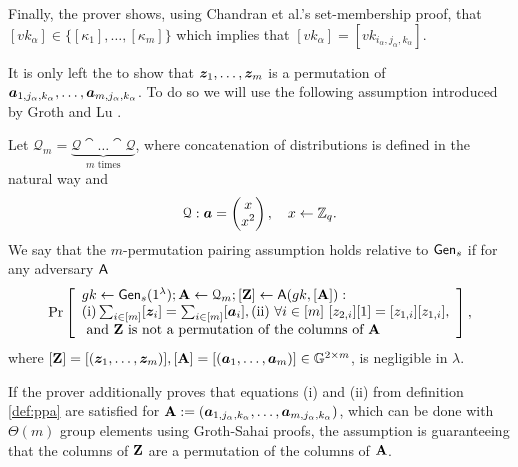 Finally, the prover  shows, using Chandran et al.'s set-membership proof, that $[vk_\alpha]\in\{[\kappa_1],\ldots,[\kappa_m]\}$ which implies that  $[vk_\alpha]=[vk_{i_\alpha,j_\alpha,k_\alpha}]$.

It is only left the to show that ${\boldsymbol{z}}_1,\ldots,{\boldsymbol{z}}_m$ is a permutation of ${\boldsymbol{a}}_{1,j_\alpha,k_\alpha},\ldots,\allowbreak{\boldsymbol{a}}_{m,j_\alpha,k_\alpha}$. To do so we will use the following assumption introduced by Groth and Lu \cite{AC:GroLu07}.
\begin{definition}\label{def:ppa}
Let $\mathcal{Q}_{m}=\underbrace{\mathcal{Q}\cat\ldots\cat\mathcal{Q}}_{m\text{ times}}$, where concatenation of  distributions is defined in the natural way and 
$$\mathcal{Q}: {\boldsymbol{a}}=\left(\begin{matrix}x\\x^2\end{matrix}\right),\quad x\gets\mathbb{Z}_q.$$
We say that the $m$-permutation pairing assumption holds relative to $\mathsf{Gen}_s$ if for any adversary $\mathsf{A}$
$$
\Pr\left[
\begin{array}{l}
gk\gets\mathsf{Gen}_s(1^\lambda);\mathbf{{A}}\gets\mathcal{Q}_{m};[\mathbf{{Z}}]\gets\mathsf{A}(gk,[\mathbf{{A}}]):\\
\mathrm{(i)} \sum_{i\in[m]}[{\boldsymbol{z}}_i]=\sum_{i\in[m]}[{\boldsymbol{a}}_i], \mathrm{(ii)}\ \forall i\in[m]\ [z_{2,i}][1]=[z_{1,i}][z_{1,i}],\\
\text{ and }\mathbf{{Z}}\text{ is not a permutation of the columns of }\mathbf{{A}}
\end{array}
\right],
$$
where $[\mathbf{{Z}}]=[({\boldsymbol{z}}_1,\ldots,{\boldsymbol{z}}_m)], [\mathbf{{A}}]=[({\boldsymbol{a}}_1,\ldots,{\boldsymbol{a}}_m)]\in\mathbb{G}^{2\times m}$,
is negligible in $\lambda$.
\end{definition}

If the prover additionally proves that equations (i) and (ii) from definition \ref{def:ppa} are satisfied for $\mathbf{{A}}:=({\boldsymbol{a}}_{1,j_\alpha,k_\alpha},\ldots,{\boldsymbol{a}}_{m,j_\alpha,k_\alpha})$, which can be done with $\Theta(m)$ group elements using Groth-Sahai proofs, the assumption is guaranteeing that the columns of $\mathbf{{Z}}$ are a permutation of the columns of $\mathbf{{A}}$.

